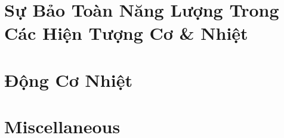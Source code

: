 \documentclass{article}
\numberwithin{equation}{section}
\begin{document}

\section{Sự Bảo Toàn Năng Lượng Trong Các Hiện Tượng Cơ \& Nhiệt}


\section{Động Cơ Nhiệt}


\section{Miscellaneous}


\printbibliography[heading=bibintoc]
	
\end{document}

